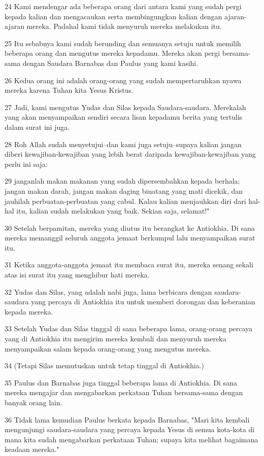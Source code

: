 \par 24 Kami mendengar ada beberapa orang dari antara kami yang sudah pergi kepada kalian dan mengacaukan serta membingungkan kalian dengan ajaran-ajaran mereka. Padahal kami tidak menyuruh mereka melakukan itu.
\par 25 Itu sebabnya kami sudah berunding dan semuanya setuju untuk memilih beberapa orang dan mengutus mereka kepadamu. Mereka akan pergi bersama-sama dengan Saudara Barnabas dan Paulus yang kami kasihi.
\par 26 Kedua orang ini adalah orang-orang yang sudah mempertaruhkan nyawa mereka karena Tuhan kita Yesus Kristus.
\par 27 Jadi, kami mengutus Yudas dan Silas kepada Saudara-saudara. Merekalah yang akan menyampaikan sendiri secara lisan kepadamu berita yang tertulis dalam surat ini juga.
\par 28 Roh Allah sudah menyetujui--dan kami juga setuju--supaya kalian jangan diberi kewajiban-kewajiban yang lebih berat daripada kewajiban-kewajiban yang perlu ini saja:
\par 29 janganlah makan makanan yang sudah dipersembahkan kepada berhala; jangan makan darah, jangan makan daging binatang yang mati dicekik, dan jauhilah perbuatan-perbuatan yang cabul. Kalau kalian menjauhkan diri dari hal-hal itu, kalian sudah melakukan yang baik. Sekian saja, selamat!"
\par 30 Setelah berpamitan, mereka yang diutus itu berangkat ke Antiokhia. Di sana mereka memanggil seluruh anggota jemaat berkumpul lalu menyampaikan surat itu.
\par 31 Ketika anggota-anggota jemaat itu membaca surat itu, mereka senang sekali atas isi surat itu yang menghibur hati mereka.
\par 32 Yudas dan Silas, yang adalah nabi juga, lama berbicara dengan saudara-saudara yang percaya di Antiokhia itu untuk memberi dorongan dan keberanian kepada mereka.
\par 33 Setelah Yudas dan Silas tinggal di sana beberapa lama, orang-orang percaya yang di Antiokhia itu mengirim mereka kembali dan menyuruh mereka menyampaikan salam kepada orang-orang yang mengutus mereka.
\par 34 (Tetapi Silas memutuskan untuk tetap tinggal di Antiokhia.)
\par 35 Paulus dan Barnabas juga tinggal beberapa lama di Antiokhia. Di sana mereka mengajar dan mengabarkan perkataan Tuhan bersama-sama dengan banyak orang lain.
\par 36 Tidak lama kemudian Paulus berkata kepada Barnabas, "Mari kita kembali mengunjungi saudara-saudara yang percaya kepada Yesus di semua kota-kota di mana kita sudah mengabarkan perkataan Tuhan; supaya kita melihat bagaimana keadaan mereka."
